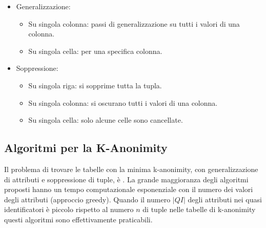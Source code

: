\begin{itemize}
  \item Generalizzazione:
    \begin{itemize}
      \item Su singola colonna: passi di generalizzazione su tutti i valori di una colonna. 
      \item Su singola cella: per una specifica colonna. 
    \end{itemize}
  \item Soppressione: 
    \begin{itemize}
      \item Su singola riga: si sopprime tutta la tupla. 
      \item Su singola colonna: si oscurano tutti i valori di una colonna. 
      \item Su singola cella: solo alcune celle sono cancellate.
    \end{itemize}
\end{itemize}

\subsection{Algoritmi per la K-Anonimity}

Il problema di trovare le tabelle con la minima k-anonimity, con generalizzazione di attributi e soppressione di tuple, è . La grande maggioranza degli algoritmi proposti hanno un tempo computazionale esponenziale con il numero dei valori degli attributi (approccio greedy). Quando il numero $|QI|$ degli attributi nei quasi identificatori è piccolo rispetto al numero $n$ di tuple nelle tabelle di k-anonimity questi algoritmi sono effettivamente praticabili.


